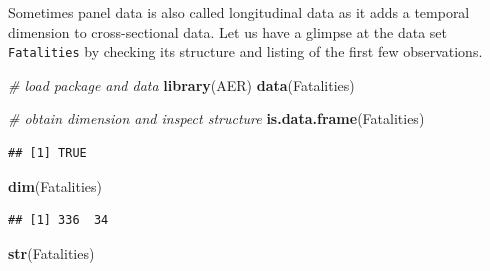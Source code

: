 \documentclass[]{book}
\newenvironment{Shaded}{\begin{snugshade}}{\end{snugshade}}
\newcommand{\KeywordTok}[1]{\textcolor[rgb]{0.13,0.29,0.53}{\textbf{#1}}}
\newcommand{\CommentTok}[1]{\textcolor[rgb]{0.56,0.35,0.01}{\textit{#1}}}
\newcommand{\NormalTok}[1]{#1}
\theoremstyle{definition}
\theoremstyle{definition}
\theoremstyle{definition}
\theoremstyle{remark}
\begin{document}
Sometimes panel data is also called longitudinal data as it adds a
temporal dimension to cross-sectional data. Let us have a glimpse at the
data set \texttt{Fatalities} by checking its structure and listing of
the first few observations.

\begin{Shaded}
\begin{Highlighting}[]
\CommentTok{# load package and data}
\KeywordTok{library}\NormalTok{(AER)}
\KeywordTok{data}\NormalTok{(Fatalities)}

\CommentTok{# obtain dimension and inspect structure}
\KeywordTok{is.data.frame}\NormalTok{(Fatalities)}
\end{Highlighting}
\end{Shaded}

\begin{verbatim}
## [1] TRUE
\end{verbatim}

\begin{Shaded}
\begin{Highlighting}[]
\KeywordTok{dim}\NormalTok{(Fatalities)}
\end{Highlighting}
\end{Shaded}

\begin{verbatim}
## [1] 336  34
\end{verbatim}

\begin{Shaded}
\begin{Highlighting}[]
\KeywordTok{str}\NormalTok{(Fatalities)}
\end{Highlighting}
\end{Shaded}
\end{document}

